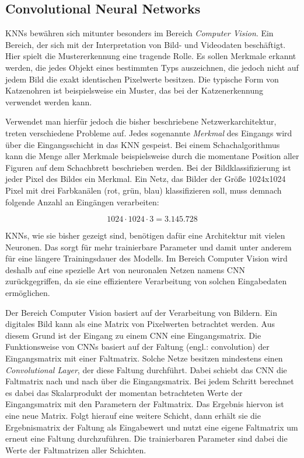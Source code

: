 \subsection{Convolutional Neural Networks}
\acp{KNN} bewähren sich mitunter besonders im Bereich \emph{Computer Vision}. Ein Bereich, der sich mit der Interpretation von Bild- und Videodaten beschäftigt. Hier spielt die Mustererkennung eine tragende Rolle. Es sollen Merkmale erkannt werden, die jedes Objekt eines bestimmten Typs auszeichnen, die jedoch nicht auf jedem Bild die exakt identischen Pixelwerte besitzen. Die typische Form von Katzenohren ist beispielsweise ein Muster, das bei der Katzenerkennung verwendet werden kann. \cite{knnsKompakt}

Verwendet man hierfür jedoch die bisher beschriebene Netzwerkarchitektur, treten verschiedene Probleme auf. Jedes sogenannte \emph{Merkmal} des Eingangs wird über die Eingangsschicht in das \ac{KNN} gespeist. Bei einem Schachalgorithmus kann die Menge aller Merkmale beispielsweise durch die momentane Position aller Figuren auf dem Schachbrett beschrieben werden. Bei der Bildklassifizierung ist jeder Pixel des Bildes ein Merkmal. Ein Netz, das Bilder der Größe 1024x1024 Pixel mit drei Farbkanälen (rot, grün, blau) klassifizieren soll, muss demnach folgende Anzahl an Eingängen verarbeiten: \cite{knnsKompakt}

\begin{equation}
   1024 \cdot 1024 \cdot 3 = 3.145.728
\end{equation}

\acp{KNN}, wie sie bisher gezeigt sind, benötigen dafür eine Architektur mit vielen Neuronen. Das sorgt für mehr trainierbare Parameter und damit unter anderem für eine längere Trainingsdauer des Modells. Im Bereich Computer Vision wird deshalb auf eine spezielle Art von neuronalen Netzen namens \ac{CNN} zurückgegriffen, da sie eine effizientere Verarbeitung von solchen Eingabedaten ermöglichen. \cite{knnsKompakt} 

Der Bereich Computer Vision basiert auf der Verarbeitung von Bildern. Ein digitales Bild kann als eine Matrix von Pixelwerten betrachtet werden. Aus diesem Grund ist der Eingang zu einem \ac{CNN} eine Eingangsmatrix. Die Funktionsweise von \acp{CNN} basiert auf der Faltung (\ac{engl.}: convolution) der Eingangsmatrix mit einer Faltmatrix. Solche Netze besitzen mindestens einen \emph{Convolutional Layer}, der diese Faltung durchführt. Dabei schiebt das \ac{CNN} die Faltmatrix nach und nach über die Eingangsmatrix. Bei jedem Schritt berechnet es dabei das Skalarprodukt der momentan betrachteten Werte der Eingangsmatrix mit den Parametern der Faltmatrix. Das Ergebnis hiervon ist eine neue Matrix. Folgt hierauf eine weitere Schicht, dann erhält sie die Ergebnismatrix der Faltung als Eingabewert und nutzt eine eigene Faltmatrix um erneut eine Faltung durchzuführen. Die trainierbaren Parameter sind dabei die Werte der Faltmatrizen aller Schichten. \cite{DeepLearningBook}

